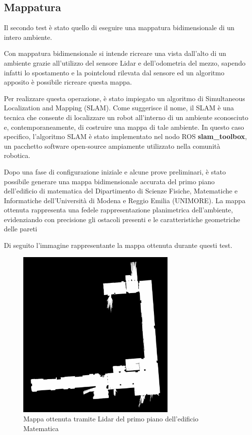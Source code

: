\subsection{Mappatura}
Il secondo test è stato quello di eseguire una mappatura bidimensionale di un intero ambiente.

\noindent Con mappatura bidimensionale si intende ricreare una vista dall'alto di un ambiente grazie all'utilizzo del sensore Lidar e dell'odometria del mezzo, sapendo infatti lo spostamento e la pointcloud rilevata dal sensore ed un algoritmo apposito è possibile ricreare questa mappa.

\noindent Per realizzare questa operazione, è stato impiegato un algoritmo di Simultaneous Localization and Mapping (SLAM). Come suggerisce il nome, il SLAM è una tecnica che consente di localizzare un robot all'interno di un ambiente sconosciuto e, contemporaneamente, di costruire una mappa di tale ambiente. In questo caso specifico, l'algoritmo SLAM è stato implementato nel nodo ROS \textbf{slam\_toolbox}, un pacchetto software open-source ampiamente utilizzato nella comunità robotica.

\noindent Dopo una fase di configurazione iniziale e alcune prove preliminari, è stato possibile generare una mappa bidimensionale accurata del primo piano dell'edificio di matematica del Dipartimento di Scienze Fisiche, Matematiche e Informatiche dell'Università di Modena e Reggio Emilia (UNIMORE). La mappa ottenuta rappresenta una fedele rappresentazione planimetrica dell'ambiente, evidenziando con precisione gli ostacoli presenti e le caratteristiche geometriche delle pareti

\noindent Di seguito l'immagine rappresentante la mappa ottenuta durante questi test.
\begin{figure}[H]
  \centering
  \includegraphics[width=0.7\textwidth]{figures/franco_map.png}
  \caption{Mappa ottenuta tramite Lidar del primo piano dell'edificio Matematica}
  \label{Mappa ottenuta tramite Lidar del primo piano dell'edificio Matematica}
\end{figure}

